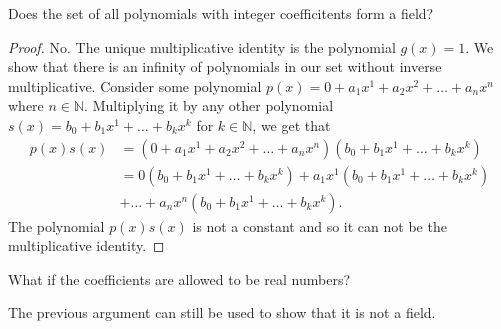 \documentclass[12pt]{article}
\newcommand{\N}{\mathbb{N}}
\newenvironment{problem}[2][Problem]{\begin{trivlist} \item[\hskip \labelsep {\bfseries #1}\hskip \labelsep {\bfseries #2.}]}{\end{trivlist}}
\newenvironment{solution}[1][Solution]{\begin{trivlist} \item[\hskip \labelsep {\bfseries #1}]}{\end{trivlist}}
\begin{document}
\begin{problem}{6}
\begin{enumerate}
  \item Does the set of all polynomials with integer coefficitents form a field?
\begin{proof}
  No. The unique multiplicative identity is the polynomial $g(x) = 1$. We show that there is an infinity of polynomials in our set without inverse multiplicative. Consider some polynomial $p(x) = 0 + a_{1}x^{1} + a_{2}x^{2} + \dots + a_{n}x^{n}$ where $n\in \N$. Multiplying it by any other polynomial $s(x) = b_{0}+b_{1}x^{1}+\dots+b_{k}x^{k}$ for $k\in \N$, we get that
\begin{align*}
  p(x)s(x) &= \left( 0+a_{1}x^{1}+a_{2}x^{2}+\dots+a_{n}x^{n} \right)\left( b_{0}+b_{1}x^{1}+\dots+b_{k}x^{k} \right)\\
  &= 0\left( b_{0}+b_{1}x^{1}+\dots+b_{k}x^{k} \right) + a_{1}x^{1}\left( b_{0}+b_{1}x^{1}+\dots+b_{k}x^{k} \right)\\
  &+\dots+a_{n}x^{n}\left( b_{0}+b_{1}x^{1}+\dots+b_{k}x^{k} \right).
\end{align*}
The polynomial $p(x)s(x)$ is not a constant and so it can not be the multiplicative identity. 
\end{proof}
  \item What if the coefficients are allowed to be real numbers?
\begin{solution}
  The previous argument can still be used to show that it is not a field.  
\end{solution}
\end{enumerate}
\end{problem}
\end{document}
